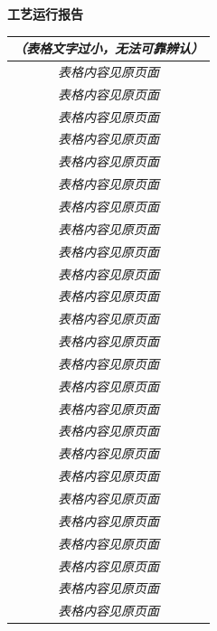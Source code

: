 \documentclass[UTF8,10pt,a4paper,fontset=fandol]{ctexart}
\begin{document}
\hfill
\begin{minipage}[t]{0.47\textwidth}
\centering
\textbf{工艺运行报告}

\vspace{0.3em}
\small
\begin{tabularx}{\linewidth}{|c|X|}
\hline
\multicolumn{2}{c}{\textit{（表格文字过小，无法可靠辨认）}}\\
\hline
\multicolumn{2}{c}{\textit{表格内容见原页面}}\\
\hline
\multicolumn{2}{c}{\textit{表格内容见原页面}}\\
\hline
\multicolumn{2}{c}{\textit{表格内容见原页面}}\\
\hline
\multicolumn{2}{c}{\textit{表格内容见原页面}}\\
\hline
\multicolumn{2}{c}{\textit{表格内容见原页面}}\\
\hline
\multicolumn{2}{c}{\textit{表格内容见原页面}}\\
\hline
\multicolumn{2}{c}{\textit{表格内容见原页面}}\\
\hline
\multicolumn{2}{c}{\textit{表格内容见原页面}}\\
\hline
\multicolumn{2}{c}{\textit{表格内容见原页面}}\\
\hline
\multicolumn{2}{c}{\textit{表格内容见原页面}}\\
\hline
\multicolumn{2}{c}{\textit{表格内容见原页面}}\\
\hline
\multicolumn{2}{c}{\textit{表格内容见原页面}}\\
\hline
\multicolumn{2}{c}{\textit{表格内容见原页面}}\\
\hline
\multicolumn{2}{c}{\textit{表格内容见原页面}}\\
\hline
\multicolumn{2}{c}{\textit{表格内容见原页面}}\\
\hline
\multicolumn{2}{c}{\textit{表格内容见原页面}}\\
\hline
\multicolumn{2}{c}{\textit{表格内容见原页面}}\\
\hline
\multicolumn{2}{c}{\textit{表格内容见原页面}}\\
\hline
\multicolumn{2}{c}{\textit{表格内容见原页面}}\\
\hline
\multicolumn{2}{c}{\textit{表格内容见原页面}}\\
\hline
\multicolumn{2}{c}{\textit{表格内容见原页面}}\\
\hline
\multicolumn{2}{c}{\textit{表格内容见原页面}}\\
\hline
\multicolumn{2}{c}{\textit{表格内容见原页面}}\\
\hline
\multicolumn{2}{c}{\textit{表格内容见原页面}}\\
\hline
\multicolumn{2}{c}{\textit{表格内容见原页面}}\\
\hline
\end{tabularx}
\end{minipage}
\end{document}
